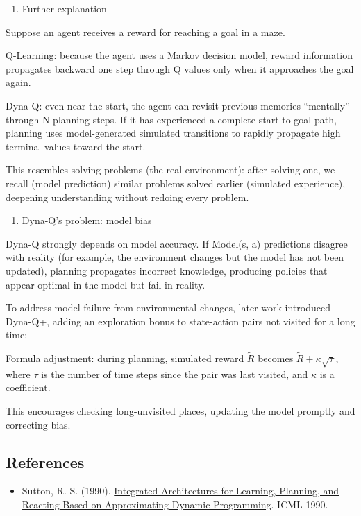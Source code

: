 \begin{enumerate}
\def\labelenumi{(\arabic{enumi})}
\setcounter{enumi}{1}
\tightlist
\item
  Further explanation
\end{enumerate}

Suppose an agent receives a reward for reaching a goal in a maze.

Q-Learning: because the agent uses a Markov decision model, reward information propagates backward one step through Q values only when it approaches the goal again.

Dyna-Q: even near the start, the agent can revisit previous memories ``mentally'' through N planning steps. If it has experienced a complete start-to-goal path, planning uses model-generated simulated transitions to rapidly propagate high terminal values toward the start.

This resembles solving problems (the real environment): after solving one, we recall (model prediction) similar problems solved earlier (simulated experience), deepening understanding without redoing every problem.

\begin{enumerate}
\def\labelenumi{(\arabic{enumi})}
\setcounter{enumi}{2}
\tightlist
\item
  Dyna-Q's problem: model bias
\end{enumerate}

Dyna-Q strongly depends on model accuracy. If Model(s, a) predictions disagree with reality (for example, the environment changes but the model has not been updated), planning propagates incorrect knowledge, producing policies that appear optimal in the model but fail in reality.

To address model failure from environmental changes, later work introduced Dyna-Q+, adding an exploration bonus to state-action pairs not visited for a long time:

Formula adjustment: during planning, simulated reward \(\tilde{R}\) becomes \(\tilde{R}+\kappa\sqrt{\tau}\), where \(\tau\) is the number of time steps since the pair was last visited, and \(\kappa\) is a coefficient.

This encourages checking long-unvisited places, updating the model promptly and correcting bias.

\FloatBarrier
{}
\hypertarget{references-49}{%
\subsection{References}\label{references-49}}

\vspace{0.25em}
\begin{itemize}
\tightlist
\item
  Sutton, R. S. (1990). \href{http://incompleteideas.net/papers/sutton-90.pdf}{Integrated Architectures for Learning, Planning, and Reacting Based on Approximating Dynamic Programming}. ICML 1990.
\end{itemize}

\clearpage
